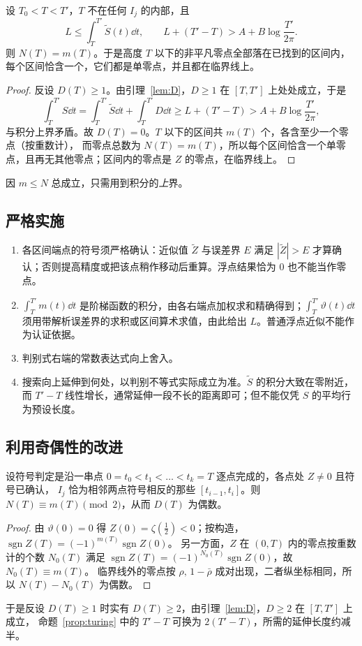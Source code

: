 \documentclass[11pt]{article}
\begin{document}
\begin{proposition}\label{prop:turing}
设 $T_0<T<T'$，$T$ 不在任何 $I_j$ 的内部，且
\[
 L\le\int_T^{T'}\widetilde S(t)\dd t,\qquad L+(T'-T)>A+B\log\frac{T'}{2\pi}.
\]
则 $N(T)=m(T)$。于是高度 $T$ 以下的非平凡零点全部落在已找到的区间内，每个区间恰含一个，它们都是单零点，并且都在临界线上。
\end{proposition}
\begin{proof}
反设 $D(T)\ge1$。由引理~\ref{lem:D}，$D\ge1$ 在 $[T,T']$ 上处处成立，于是
\[
 \int_T^{T'}S\dd t=\int_T^{T'}\widetilde S\dd t+\int_T^{T'}D\dd t\ge L+(T'-T)>A+B\log\frac{T'}{2\pi},
\]
与积分上界矛盾。故 $D(T)=0$。$T$ 以下的区间共 $m(T)$ 个，各含至少一个零点（按重数计），
而零点总数为 $N(T)=m(T)$，所以每个区间恰含一个单零点，且再无其他零点；区间内的零点是 $Z$ 的零点，在临界线上。
\end{proof}
因 $m\le N$ 总成立，只需用到积分的\emph{上}界。

\subsection{严格实施}
\begin{enumerate}
 \item 各区间端点的符号须严格确认：近似值 $\widetilde Z$ 与误差界 $E$ 满足 $|\widetilde Z|>E$ 才算确认；否则提高精度或把该点稍作移动后重算。浮点结果恰为 $0$ 也不能当作零点。
 \item $\int_T^{T'}m(t)\dd t$ 是阶梯函数的积分，由各右端点加权求和精确得到；$\int_T^{T'}\vartheta(t)\dd t$ 须用带解析误差界的求积或区间算术求值，由此给出 $L$。普通浮点近似不能作为认证依据。
 \item 判别式右端的常数表达式向上舍入。
 \item 搜索向上延伸到何处，以判别不等式实际成立为准。$\widetilde S$ 的积分大致在零附近，而 $T'-T$ 线性增长，通常延伸一段不长的距离即可；但不能仅凭 $S$ 的平均行为预设长度。
\end{enumerate}

\subsection{利用奇偶性的改进}
\begin{proposition}
设符号判定是沿一串点 $0=t_0<t_1<\dots<t_k=T$ 逐点完成的，各点处 $Z\ne0$ 且符号已确认，
$I_j$ 恰为相邻两点符号相反的那些 $[t_{i-1},t_i]$。则 $N(T)\equiv m(T)\pmod 2$，从而 $D(T)$ 为偶数。
\end{proposition}
\begin{proof}
由 $\vartheta(0)=0$ 得 $Z(0)=\zeta(\tfrac12)<0$；按构造，$\operatorname{sgn}Z(T)=(-1)^{m(T)}\operatorname{sgn}Z(0)$。
另一方面，$Z$ 在 $(0,T)$ 内的零点按重数计的个数 $N_0(T)$ 满足 $\operatorname{sgn}Z(T)=(-1)^{N_0(T)}\operatorname{sgn}Z(0)$，故 $N_0(T)\equiv m(T)$。
临界线外的零点按 $\rho,\,1-\bar\rho$ 成对出现，二者纵坐标相同，所以 $N(T)-N_0(T)$ 为偶数。
\end{proof}
于是反设 $D(T)\ge1$ 时实有 $D(T)\ge2$，由引理~\ref{lem:D}，$D\ge2$ 在 $[T,T']$ 上成立，
命题~\ref{prop:turing} 中的 $T'-T$ 可换为 $2(T'-T)$，所需的延伸长度约减半。
\end{document}

